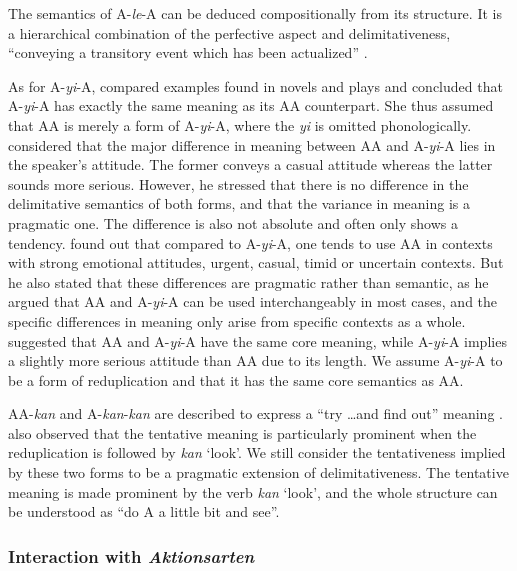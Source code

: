 The semantics of A-\textit{le}-A can be deduced compositionally from its structure. 
It is a hierarchical combination of the perfective aspect and delimitativeness, ``conveying a transitory event which has been actualized'' \citep[151]{XiaoMcEnery2004}.


As for A-\textit{yi}-A, \citet[273]{Fan1964} compared examples found in novels and plays and concluded that A-\textit{yi}-A has exactly the same meaning as its AA counterpart.
She thus assumed that AA is merely a form of A-\textit{yi}-A, where the \textit{yi} is omitted phonologically.
\citet[Sec. 5]{Xing2000} considered that the major  difference in meaning  between AA and A-\textit{yi}-A lies in the speaker's attitude.
The former conveys a casual attitude whereas the latter sounds more serious.
However, he stressed that there is no difference in the delimitative semantics of both forms,
and that the variance in meaning is a pragmatic one.
The difference is also not absolute and often only shows a tendency.
\citet{Xu2002} found out that compared to A-\textit{yi}-A, one tends to use AA in contexts with strong emotional attitudes, urgent, casual, timid or uncertain contexts.
But he also stated that these differences are pragmatic rather than semantic, 
as he argued that AA and A-\textit{yi}-A can be used interchangeably in most cases,
and the specific differences in meaning only arise from specific contexts as a whole.
\citet[15]{Yang2003} suggested that AA and A-\textit{yi}-A have the same core meaning, while A-\textit{yi}-A implies a slightly more serious attitude than AA due to its length.
We assume A-\textit{yi}-A to be a form of reduplication and that it has the same core semantics as AA.

AA-\textit{kan} and A-\textit{kan}-\textit{kan} are described to express a ``try \ldots and find out'' meaning \citep[63]{Cheng2012}.
\citet[290]{Tsao2001} also observed that the tentative meaning is particularly prominent when the reduplication is followed by \textit{kan} `look'.
We still consider the tentativeness implied by these two forms to be a pragmatic extension of delimitativeness.
The tentative meaning is made prominent by the verb \textit{kan} `look',
and the whole structure can be understood as ``do A a little bit and see''.




\subsubsection{Interaction with \textit{Aktionsarten}}\label{sec:Aktionsarten}

